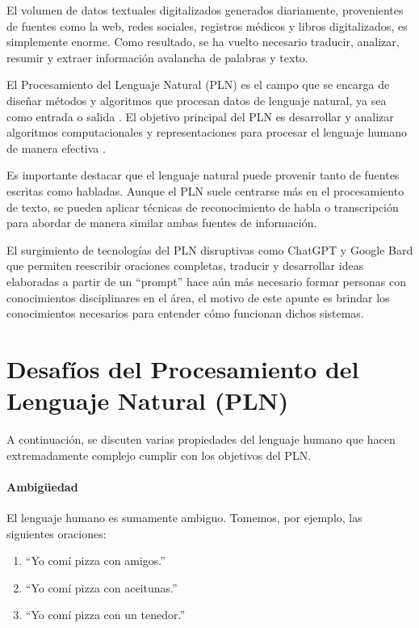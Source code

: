
El volumen de datos textuales digitalizados generados diariamente, provenientes de fuentes como la web, redes sociales, registros médicos y libros digitalizados, es simplemente enorme. Como resultado, se ha vuelto necesario traducir, analizar, resumir y extraer información avalancha de palabras y texto.

El Procesamiento del Lenguaje Natural (PLN) es el campo que se encarga de diseñar métodos y algoritmos que procesan datos de lenguaje natural, ya sea como entrada o salida \cite{goldberg2017neural}. El objetivo principal del PLN es desarrollar y analizar algoritmos computacionales y representaciones para procesar el lenguaje humano de manera efectiva \cite{jacobbook}.

Es importante destacar que el lenguaje natural puede provenir tanto de fuentes escritas como habladas. Aunque el PLN suele centrarse más en el procesamiento de texto, se pueden aplicar técnicas de reconocimiento de habla o transcripción para abordar de manera similar ambas fuentes de información.

El surgimiento de tecnologías del PLN disruptivas como ChatGPT y Google Bard que permiten reescribir oraciones completas, traducir y desarrollar ideas elaboradas a partir de un ``prompt'' hace aún más necesario formar personas con conocimientos disciplinares en el área, el motivo de este apunte es brindar los conocimientos necesarios para entender cómo funcionan dichos sistemas.

\section{Desafíos del Procesamiento del Lenguaje Natural (PLN)}

A continuación, se discuten varias propiedades del lenguaje humano que hacen extremadamente complejo cumplir con los objetivos del PLN.

\paragraph{Ambigüedad}

El lenguaje humano es sumamente ambiguo. Tomemos, por ejemplo, las siguientes oraciones:

\begin{enumerate}
  \item ``Yo comí pizza con amigos.''
  \item ``Yo comí pizza con aceitunas.''
  \item ``Yo comí pizza con un tenedor.''
\end{enumerate}


